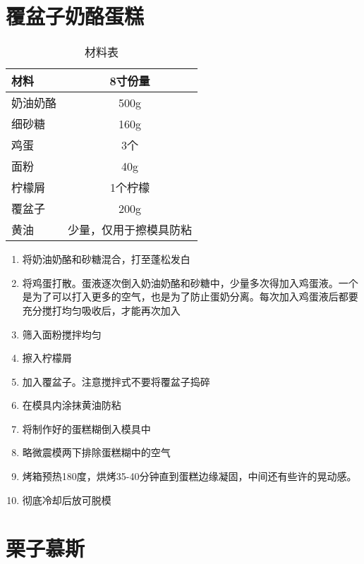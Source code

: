 \section{覆盆子奶酪蛋糕}

\begin{table}[H]
    \centering
    \begin{tabular}{|l||c|}\hline
     \textbf{材料}    &  \textbf{8寸份量}\\ \hline\hline
    奶油奶酪 &  500g\\ \hline
    细砂糖 &  160g\\ \hline
    鸡蛋  &  3个\\ \hline
    面粉  &  40g \\ \hline
    柠檬屑  &  1个柠檬\\ \hline
    覆盆子  &  200g\\ \hline
    黄油  & 少量，仅用于擦模具防粘 \\ \hline
    \end{tabular}
    \caption{材料表}
\end{table}

\begin{enumerate}
    \item 将奶油奶酪和砂糖混合，打至蓬松发白
    \item 将鸡蛋打散。蛋液逐次倒入奶油奶酪和砂糖中，少量多次得加入鸡蛋液。一个是为了可以打入更多的空气，也是为了防止蛋奶分离。每次加入鸡蛋液后都要充分搅打均匀吸收后，才能再次加入
    \item 筛入面粉搅拌均匀
    \item 擦入柠檬屑
    \item 加入覆盆子。注意搅拌式不要将覆盆子捣碎
    \item 在模具内涂抹黄油防粘
    \item 将制作好的蛋糕糊倒入模具中
    \item 略微震模两下排除蛋糕糊中的空气
    \item 烤箱预热180度，烘烤35-40分钟直到蛋糕边缘凝固，中间还有些许的晃动感。
    \item 彻底冷却后放可脱模
\end{enumerate}




\section{栗子慕斯}

